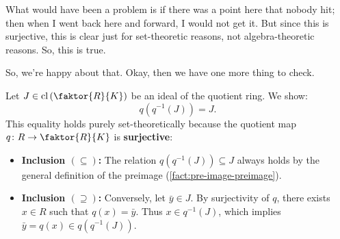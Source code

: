 \begin{proofWrapper}
\begin{speech}[00:30:18 - 00:31:26]
What would have been a problem is if there was a point here that nobody hit; then when I went back here and forward, I would not get it. But since this is surjective, this is clear just for set-theoretic reasons, not algebra-theoretic reasons. So, this is true. 

So, we're happy about that. Okay, then we have one more thing to check.
\end{speech}

\begin{content}[Bijective Property Part (A): \texorpdfstring{$q(q^{-1}(J)) = J$}{q(q^{-1}(J)) = J}]
Let $J \in \operatorname{cl}\left(\faktor{R}{K}\right)$ be an ideal of the quotient ring. We show:
\begin{equation}\label{eq:composition-step-a}
q(q^{-1}(J)) = J.
\end{equation}
This equality holds purely set-theoretically because the quotient map $q \colon R \to \faktor{R}{K}$ is \textbf{surjective}:
\begin{itemize}
    \item \textbf{Inclusion $(\subseteq)$:} The relation $q(q^{-1}(J)) \subseteq J$ always holds by the general definition of the preimage (\cref{fact:pre-image-preimage}).
    \item \textbf{Inclusion $(\supseteq)$:} Conversely, let $\bar{y} \in J$. By surjectivity of $q$, there exists $x \in R$ such that $q(x) = \bar{y}$. Thus $x \in q^{-1}(J)$, which implies $\bar{y} = q(x) \in q(q^{-1}(J))$.
\end{itemize}

\begin{center}
\end{center}
\end{content}
\end{proofWrapper}
